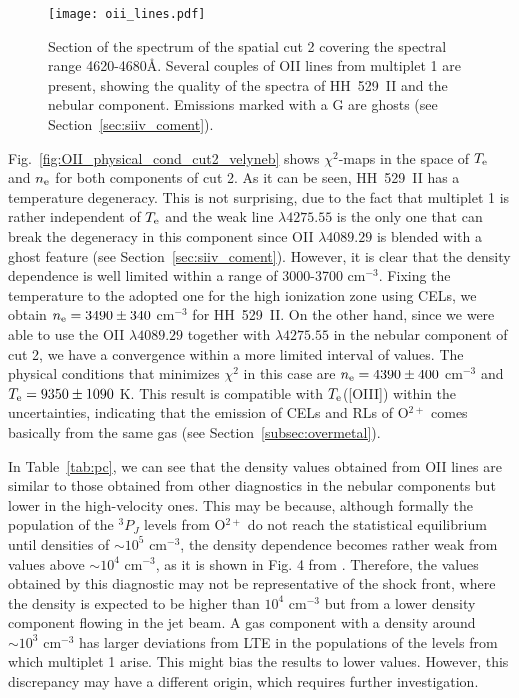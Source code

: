 \documentclass[fleqn,usenatbib]{mnras}
\begin{document}
\begin{figure}
\texttt{[image: oii\_lines.pdf]}
\caption{Section of the spectrum of the spatial cut 2 covering the spectral range 4620-4680\AA. Several couples of O\thinspace II lines from multiplet 1 are present, showing the quality of the spectra of HH~529~II and the nebular component. Emissions marked with a G are ghosts (see Section~\ref{sec:siiv_coment}). }
\label{fig:oii_lines}
\end{figure}

Fig.~\ref{fig:OII_physical_cond_cut2_velyneb} shows $\chi^2$-maps in the space of $T_{\rm e}$ and $n_{\rm e}$ for both components of cut 2. As it can be seen, HH~529~II has a temperature degeneracy. This is not surprising, due to the fact that multiplet 1 is rather independent of $T_{\rm e}$ and the weak line $\lambda 4275.55$ is the only one that can break the degeneracy in this component since O\thinspace II $\lambda 4089.29$ is blended with a ghost feature (see Section~\ref{sec:siiv_coment}). However, it is clear that the density dependence is well limited within a range of 3000-3700 cm$^{-3}$. Fixing the temperature to the adopted one for the high ionization zone using CELs, we obtain $n_{\rm e} = 3490 \pm 340$ cm$^{-3}$ for HH~529~II. On the other hand, since we were able to use the O\thinspace II $\lambda 4089.29$ together with $\lambda 4275.55$ in the nebular component of cut 2, we have a convergence within a more limited interval of values. The physical conditions that minimizes $\chi^2$ in this case are $n_{\rm e} = 4390 \pm 400$ cm$^{-3}$ and $T_{\rm e} = 9350 \pm 1090$ K. This result is compatible with $T_{\rm e}$([O\thinspace III]) within the uncertainties,  indicating that the emission of CELs and RLs of O$^{2+}$ comes basically from the same gas (see Section~\ref{subsec:overmetal}). 

In Table~\ref{tab:pc}, we can see that the density values obtained from O\thinspace II lines are similar to those obtained from other diagnostics in the nebular components but lower in the high-velocity ones. This may be because, although formally the population of the $^3P_J$ levels from O$^{2+}$ do not reach the statistical equilibrium until densities of $\sim 10^5 \text{ cm}^{-3}$, the density dependence becomes rather weak from values above $\sim 10^4 \text{ cm}^{-3}$, as it is shown in Fig. 4 from \citet{Storey17}. Therefore, the values obtained by this diagnostic may not be representative of the shock front, where the density is expected to be higher than $10^4 \text{ cm}^{-3}$ but from a lower density component flowing in the jet beam. A gas component with a density around $\sim 10^3 \text{ cm}^{-3}$ has larger deviations from LTE in the populations of the levels from which multiplet 1 arise. This might bias the results to lower values. However, this discrepancy may have a different origin, which requires further investigation.
\end{document}
